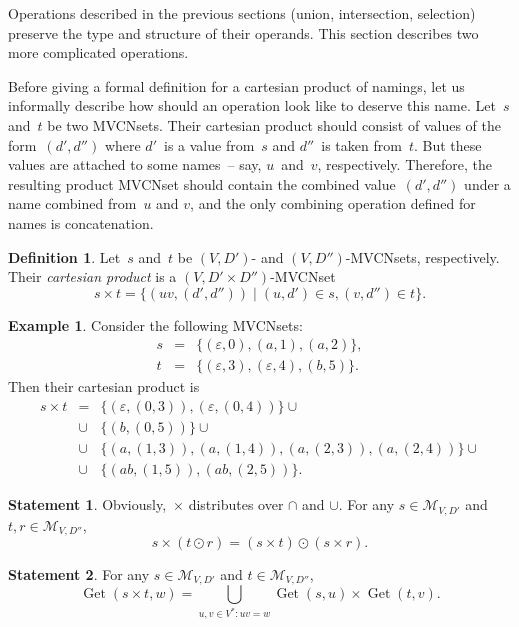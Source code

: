 \documentclass{article}
\theoremstyle{definition}
\newtheorem{Df}{Definition}
\newtheorem{St}{Statement}
\newtheorem{Ex}{Example}
\newcommand{\setcharmvcn}{M}
\newcommand{\setsymbol}[3]{\mathcal{#1}_{#2,#3}}
\newcommand{\setmvcn}[2]{\setsymbol{\setcharmvcn}{#1}{#2}}
\newcommand{\deref}{\operatorname{Get}}
\begin{document}
Operations described in the previous sections (union, intersection, selection)
preserve the type and structure of their operands. This section describes two
more complicated operations.

Before giving a formal definition for a cartesian product of namings, let us
informally describe how should an operation look like to deserve this name.
Let~$s$ and~$t$ be two MVCNsets. Their cartesian product should consist of
values of the form~$(d',d'')$ where $d'$~is a value from~$s$ and $d''$~is taken
from~$t$. But these values are attached to some names~-- say, $u$~and~$v$,
respectively.  Therefore, the resulting product MVCNset should contain the
combined value~$(d',d'')$ under a name combined from~$u$ and $v$, and the only
combining operation defined for names is concatenation.

\begin{Df}\label{df:mvcn-cartesian}
Let~$s$ and~$t$ be $(V,D')$- and $(V,D'')$-MVCNsets, respectively. Their
\emph{cartesian product} is a $(V,D'\times D'')$-MVCNset
\[
  s\times t = \{ (uv, (d',d'')) \mid (u,d')\in s, (v,d'')\in t \} .
\]
\end{Df}

\begin{Ex}\label{ex:cartesian}
Consider the following MVCNsets:
\begin{eqnarray*}
  s & = & \{ (\varepsilon, 0), (a, 1), (a, 2) \} , \\
  t & = & \{ (\varepsilon, 3), (\varepsilon, 4), (b, 5) \} .
\end{eqnarray*}
Then their cartesian product is
\begin{eqnarray*}
  s \times t & = &  \{ (\varepsilon, (0, 3)), (\varepsilon, (0, 4)) \} \cup \\
    & \cup & \{ (b, (0, 5)) \} \cup \\
    & \cup & \{ (a, (1, 3)), (a, (1, 4)), (a, (2, 3)), (a, (2, 4)) \} \cup \\
    & \cup & \{ (ab, (1, 5)), (ab, (2, 5)) \} .
\end{eqnarray*}
\end{Ex}

\begin{St}\label{st:cartesian-distributivity}
Obviously,~$\times$ distributes over $\cap$ and $\cup$.
For any $s \in \setmvcn{V}{D'}$ and $t, r \in \setmvcn{V}{D''}$,
\[
  s\times(t\odot r) = (s\times t) \odot (s\times r) .
\]
\end{St}

\begin{St}\label{st:deref-cartesian}
For any $s \in \setmvcn{V}{D'}$ and $t \in \setmvcn{V}{D''}$,
\[
  \deref(s \times t, w) =
      \bigcup_{u,v\in V^\ast: uv = w}
          \deref(s, u)
          \times
          \deref(t, v) .
\]
\end{St}
\end{document}
